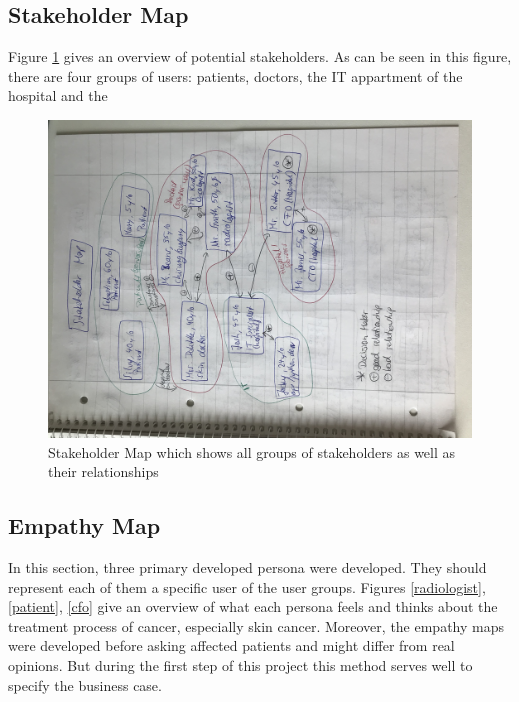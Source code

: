 \subsection{Stakeholder Map}

Figure \ref{stakeholdermap} gives an overview of potential stakeholders. As can be seen in this figure, there are four groups of users: patients, doctors, the IT appartment of the hospital and the 

\begin{figure}[h!]
	\centering
	\includegraphics[width=1\textwidth]{images/stakeholdermap.jpg}
	\caption{Stakeholder Map which shows all groups of stakeholders as well as their relationships}
	\label{stakeholdermap}
\end{figure}

\subsection{Empathy Map}

In this section, three primary developed persona were developed. They should represent each of them a specific user of the user groups. Figures \ref{radiologist}, \ref{patient}, \ref{cfo} give an overview of what each persona feels and thinks about the treatment process of cancer, especially skin cancer. Moreover, the empathy maps were developed before asking affected patients and might differ from real opinions. But during the first step of this project this method serves well to specify the business case. 

